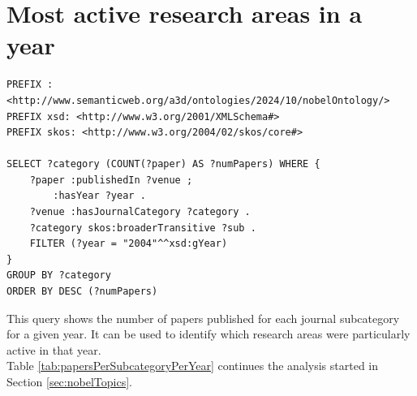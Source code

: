 \documentclass{article}
\begin{document}
\newpage

\section{Most active research areas in a year} \label{moreActiveResearchAreas}
\begin{lstlisting}
PREFIX : <http://www.semanticweb.org/a3d/ontologies/2024/10/nobelOntology/>
PREFIX xsd: <http://www.w3.org/2001/XMLSchema#>
PREFIX skos: <http://www.w3.org/2004/02/skos/core#>

SELECT ?category (COUNT(?paper) AS ?numPapers) WHERE {
    ?paper :publishedIn ?venue ;
        :hasYear ?year .
    ?venue :hasJournalCategory ?category .
    ?category skos:broaderTransitive ?sub .
    FILTER (?year = "2004"^^xsd:gYear)
}
GROUP BY ?category
ORDER BY DESC (?numPapers)
\end{lstlisting}

\vspace{1em}

This query shows the number of papers published for each journal subcategory for a given year.
It can be used to identify which research areas were particularly active in that year.\\

Table \ref{tab:papersPerSubcategoryPerYear} continues the analysis started in Section \ref{sec:nobelTopics}.
\end{document}
